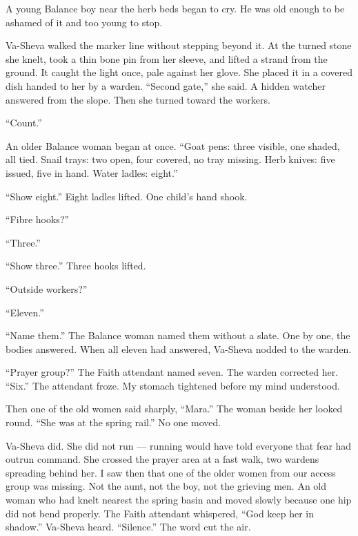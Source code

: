 A young Balance boy near the herb beds began to cry. He was old enough to be ashamed of it and too young to stop.\par

Va-Sheva walked the marker line without stepping beyond it. At the turned stone she knelt, took a thin bone pin from her sleeve, and lifted a strand from the ground. It caught the light once, pale against her glove. She placed it in a covered dish handed to her by a warden. ``Second gate,'' she said. A hidden watcher answered from the slope. Then she turned toward the workers.\par

``Count.''\par

An older Balance woman began at once. ``Goat pens: three visible, one shaded, all tied. Snail trays: two open, four covered, no tray missing. Herb knives: five issued, five in hand. Water ladles: eight.''\par

``Show eight.'' Eight ladles lifted. One child's hand shook.\par

``Fibre hooks?''\par

``Three.''\par

``Show three.'' Three hooks lifted.\par

``Outside workers?''\par

``Eleven.''\par

``Name them.'' The Balance woman named them without a slate. One by one, the bodies answered. When all eleven had answered, Va-Sheva nodded to the warden.\par

``Prayer group?'' The Faith attendant named seven. The warden corrected her. ``Six.'' The attendant froze. My stomach tightened before my mind understood.\par

Then one of the old women said sharply, ``Mara.'' The woman beside her looked round. ``She was at the spring rail.'' No one moved.\par

Va-Sheva did. She did not run --- running would have told everyone that fear had outrun command. She crossed the prayer area at a fast walk, two wardens spreading behind her. I saw then that one of the older women from our access group was missing. Not the aunt, not the boy, not the grieving men. An old woman who had knelt nearest the spring basin and moved slowly because one hip did not bend properly. The Faith attendant whispered, ``God keep her in shadow.'' Va-Sheva heard. ``Silence.'' The word cut the air.\par

